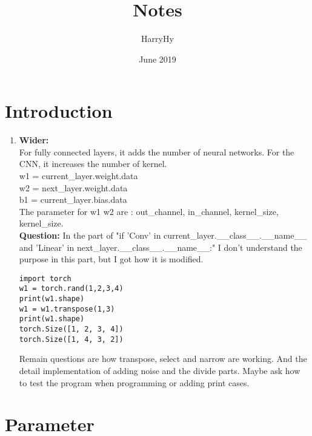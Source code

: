 \documentclass{article}
\title{Notes}
\author{HarryHy }
\date{June 2019}
\begin{document}
 

\maketitle

\section{Introduction}
\begin{enumerate}
\item{\textbf{Wider:}}\\
For fully connected layers, it adds the number of neural networks. For the CNN, it increases the number of kernel.\\
w1 = current\_layer.weight.data\\
w2 = next\_layer.weight.data\\
b1 = current\_layer.bias.data\\
The parameter for w1 w2 are : out\_channel, in\_channel, kernel\_size, kernel\_size. \\
\textbf{Question:} In the part of "if 'Conv' in current\_layer.\_\_class\_\_.\_\_name\_\_ and 'Linear' in next\_layer.\_\_class\_\_.\_\_name\_\_:" I don't understand the purpose in this part, but I got how it is modified. 
\begin{verbatim}
import torch
w1 = torch.rand(1,2,3,4)
print(w1.shape)
w1 = w1.transpose(1,3)
print(w1.shape)
torch.Size([1, 2, 3, 4])
torch.Size([1, 4, 3, 2])
\end{verbatim}
Remain questions are how transpose, select and narrow are working. And the detail implementation of adding noise and the divide parts. Maybe ask how to test the program when programming or adding print cases.
\end{enumerate}
\section{Parameter}
\end{document}
